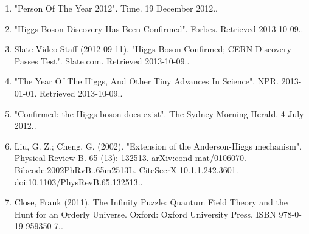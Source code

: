 \begin{enumerate}
    \item "Person Of The Year 2012". Time. 19 December 2012..
    \item "Higgs Boson Discovery Has Been Confirmed". Forbes. Retrieved 2013-10-09..
    \item Slate Video Staff (2012-09-11). "Higgs Boson Confirmed; CERN Discovery Passes Test". Slate.com. Retrieved 2013-10-09..
    \item "The Year Of The Higgs, And Other Tiny Advances In Science". NPR. 2013-01-01. Retrieved 2013-10-09..
    \item "Confirmed: the Higgs boson does exist". The Sydney Morning Herald. 4 July 2012..
    \item Liu, G. Z.; Cheng, G. (2002). "Extension of the Anderson-Higgs mechanism". Physical Review B. 65 (13): 132513. arXiv:cond-mat/0106070. Bibcode:2002PhRvB..65m2513L. CiteSeerX 10.1.1.242.3601. doi:10.1103/PhysRevB.65.132513..
    \item Close, Frank (2011). The Infinity Puzzle: Quantum Field Theory and the Hunt for an Orderly Universe. Oxford: Oxford University Press. ISBN 978-0-19-959350-7..
\end{enumerate}
